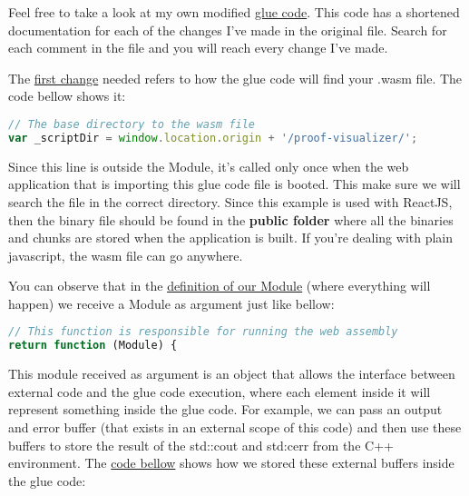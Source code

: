 \documentclass[12pt, a4paper]{article}
\begin{document}
Feel free to take a look at my own modified
\href{https://github.com/ufmg-smite/proof-visualizer/blob/main/frontend/src/wasm/cvc5.js}{glue
  code}. This code has a shortened documentation for each of the changes I've
made in the original file. Search for each comment in the file and you will
reach every change I've made.

The \href{https://github.com/ufmg-smite/proof-visualizer/blob/main/frontend/src/wasm/cvc5.js#L43}{first change} needed refers to how the glue code will find your .wasm file. The code bellow shows it:

\begin{lstlisting}[language=JavaScript]
// The base directory to the wasm file
var _scriptDir = window.location.origin + '/proof-visualizer/';
\end{lstlisting}

Since this line is outside the Module, it's called only once when the web application that is importing this glue code file is booted. This make sure we will search the file in the correct directory. Since this example is used with ReactJS, then the binary file should be found in the \textbf{public folder} where all the binaries and chunks are stored when the application is built. If you're dealing with plain javascript, the wasm file can go anywhere.

You can observe that in the \href{https://github.com/ufmg-smite/proof-visualizer/blob/main/frontend/src/wasm/cvc5.js#L45-L46}{definition of our Module} (where everything will happen) we receive a Module as argument just like bellow:

\begin{lstlisting}[language=JavaScript]
// This function is responsible for running the web assembly
return function (Module) {
\end{lstlisting}

This module received as argument is an object that allows the interface between external code and the glue code execution, where each element inside it will represent something inside the glue code. For example, we can pass an output and error buffer (that exists in an external scope of this code) and then use these buffers to store the result of the \textsf{std::cout} and \textsf{std:cerr} from the C++ environment. The \href{https://github.com/ufmg-smite/proof-visualizer/blob/main/frontend/src/wasm/cvc5.js#L116-L121}{code bellow} shows how we stored these external buffers inside the glue code:
\end{document}
